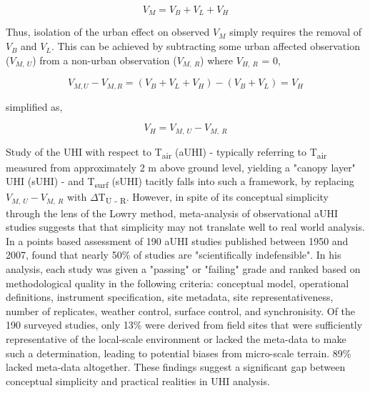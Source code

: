 \begin{bibunit}
\begin{equation}
	V_M = V_B + V_L + V_H
\end{equation}

Thus, isolation of the urban effect on observed $V_M$ simply requires the removal of $V_B$ and $V_L$. This can be achieved by subtracting some urban affected observation ($V_{M, \ U}$) from a non-urban observation ($V_{M, \ R}$) where $V_{H, \ R}$ = 0,

\begin{equation}
V_{M, U} - V_{M, R} = (V_B + V_L + V_H) - (V_B + V_L) = V_H
\end{equation}

\noindent simplified as,

\begin{equation}
	V_H = V_{M, \ U} - V_{M, \ R}
\end{equation}

Study of the UHI with respect to T\textsubscript{air} (aUHI) - typically referring to T\textsubscript{air} measured from approximately 2 \si{\meter} above ground level, yielding a "canopy layer" UHI (sUHI) - and T\textsubscript{surf} (sUHI) tacitly falls into such a framework, by replacing $V_{M, \ U} - V_{M, \ R}$ with $\Delta$T\textsubscript{U - R}. However, in spite of its conceptual simplicity through the lens of the Lowry method, meta-analysis of observational aUHI studies suggests that that simplicity may not translate well to real world analysis. In a points based assessment of 190 aUHI studies published between 1950 and 2007, \citet{Stewart2011} found that nearly 50\% of studies are "scientifically indefensible". In his analysis, each study was given a "passing" or "failing" grade and ranked based on methodological quality in the following criteria: conceptual model, operational definitions, instrument specification, site metadata, site representativeness, number of replicates, weather control, surface control, and synchronisity. Of the 190 surveyed studies, only 13\% were derived from field sites that were sufficiently representative of the local-scale environment or lacked the meta-data to make such a determination, leading to potential biases from micro-scale terrain. 89\% lacked meta-data altogether. These findings suggest a significant gap between conceptual simplicity and practical realities in UHI analysis.


\end{bibunit}

